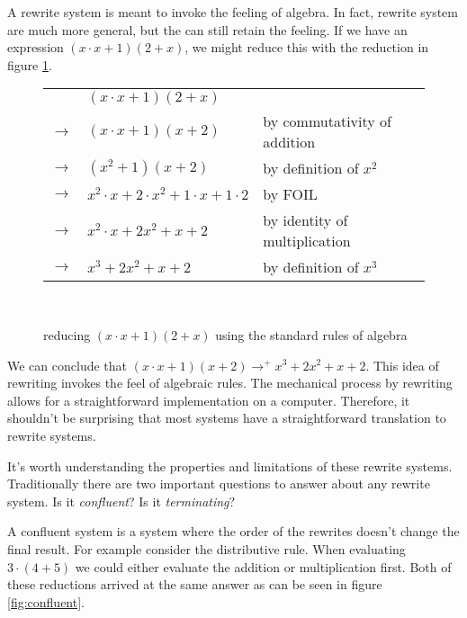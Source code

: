 \documentclass{article}
\theoremstyle{definition}
\begin{document}
A rewrite system is meant to invoke the feeling of algebra.
In fact, rewrite system are much more general, but the can still retain the feeling.
If we have an expression $(x\cdot x + 1)(2 + x)$, we might reduce this with the reduction in figure \ref{fig:reduce}.

\begin{figure}
\begin{tabular}{rll}
                  & $(x\cdot x + 1)(2 + x)$                          & \\
    $\to$ & $(x\cdot x + 1)(x + 2)$                          & by commutativity of addition \\
    $\to$ & $(x^2 + 1)(x + 2)$                               & by definition of $x^2$\\
    $\to$ & $x^2\cdot x + 2\cdot x^2 + 1\cdot x + 1 \cdot 2$ & by FOIL\\
    $\to$ & $x^2\cdot x + 2x^2 + x + 2$                      & by identity of multiplication\\ 
    $\to$ & $x^3 + 2x^2 + x + 2$                             & by definition of $x^3$\\
\end{tabular}\\
    \label{fig:reduce}
    \caption{reducing $(x\cdot x + 1)(2 + x)$ using the standard rules of algebra}
\end{figure}

We can conclude that $(x\cdot x + 1)(x + 2) \to^+ x^3 + 2x^2 + x + 2$.
This idea of rewriting invokes the feel of algebraic rules.
The mechanical process by rewriting allows for a straightforward implementation on a computer.
Therefore, it shouldn't be surprising that most systems have a straightforward translation to rewrite systems.

It's worth understanding the properties and limitations of these rewrite systems.
Traditionally there are two important questions to answer about any rewrite system.
Is it \textit{confluent}? Is it \textit{terminating}?

A confluent system is a system where the order of the rewrites doesn't change the final result.
For example consider the distributive rule.
When evaluating $3\cdot(4 + 5)$ we could either evaluate the addition or multiplication first.
Both of these reductions arrived at the same answer as can be seen in figure \ref{fig:confluent}.
\end{document}
